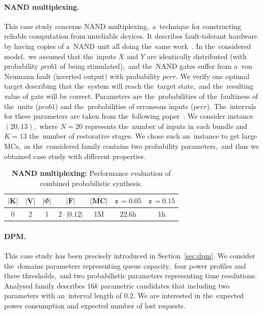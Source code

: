 \paragraph{NAND multiplexing.}
This case study concerns NAND multiplexing,~a~technique for constructing reliable computation from unreliable devices.
It describes fault-tolerant hardware by having copies of a~NAND unit all doing the~same work~\cite{nand}.
In the~considered model,~we assumed that the~inputs $X$ and $Y$ are identically distributed (with probability $prob1$ of being stimulated),~and the~NAND gates suffer from a~von Neumann fault (inverted output) with probability $perr$.
We verify one optimal target describing that the~system will reach the~target state,~and the~resulting value of gate will be correct.
Parameters are the~probabilities of the~faultiness of the~units ($prob1$) and the~probabilities of erroneous inputs ($perr$).
The~intervals for these parameters are taken from the~following paper~\cite{nand}.
We consider instance $(20, 13)$,~where $N=20$ represents the~number of inputs in each bundle and $K=13$ the~number of restorative stages.
We chose such an~instance to get large MCs,~as the~considered family contains two probability parameters,~and thus we obtained case study with different properties.

\begin{table}[h!]
\centering
\begin{tabular}{|c|c|c|c|c|c|c|}
\hline
$\lvert \mathbf{K} \rvert$ & $\lvert \mathbf{V} \rvert$ & $\lvert \varPhi \rvert$ & $\lvert \mathcal{\mathbf{F}} \rvert$ & $\overline{\mathbf{\lvert MC \rvert}}$ & $\mathbf{\varepsilon = 0.05}$ & $\mathbf{\varepsilon = 0.15}$ \\ \hline
0 & 2 & 1 & $2 \cdot \lvert 0.12 \rvert$ & 1M & 22.6h & 1h \\ \hline
\end{tabular}
\caption{\textbf{NAND multiplexing:} Performance evaluation of combined probabilistic synthesis.}
\end{table}

\paragraph{DPM.}
This case study has been precisely introduced in Section~\ref{sec:dpm}.
We consider the~domains parameters representing queue capacity,~four power profiles and three thresholds,~and two probabilistic parameters representing time resolutions.
Analysed family describes $16k$ parametric candidates that including two parameters with an~interval length of $0.2$.
We are interested in the~expected power consumption and expected number of lost requests.

